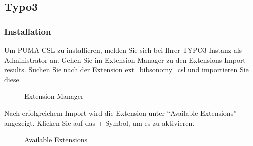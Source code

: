\subsection{Typo3}
\label{subsec:typo3}
\subsubsection*{Installation}\label{sss:installation}
Um PUMA CSL zu installieren, melden Sie sich bei Ihrer TYPO3-Instanz als Administrator an. Gehen Sie im Extension Manager zu den Extensions Import results. Suchen Sie nach der Extension ext\_bibsonomy\_csl und importieren Sie diese.
\begin{figure}[h!]
 \centering
 \caption{Extension Manager}
 \label{fig:extensionManager}
\end{figure}
Nach erfolgreichem Import wird die Extension unter \enquote{Available Extensions} angezeigt. Klicken Sie auf das +-Symbol, um es zu aktivieren.
\begin{figure}[h!]
 \centering
 \caption{Available Extensions}
 \label{fig:availableExtensions}
\end{figure}
\newline\newline
